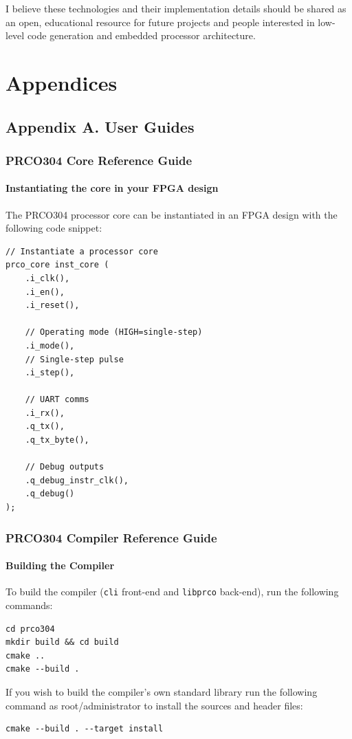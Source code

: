\documentclass[11pt,a4paper]{report}
\newcommand{\scname}{PRCO304}
\begin{document}
I believe these technologies and their implementation details should be shared as an open, educational resource for future projects and people interested in low-level code generation and embedded processor architecture.






\newpage



\newpage
\chapter{Appendices}
\linespread{1.0}
{\hypersetup{linkcolor=black}
\startcontents[chapters]
}

\section{Appendix A. User Guides}
\subsection{\scname{} Core Reference Guide}
\subsubsection*{Instantiating the core in your FPGA design}
The \scname{} processor core can be instantiated in an FPGA design with the following code snippet:
\begin{verbatim}
// Instantiate a processor core
prco_core inst_core (
    .i_clk(), 
    .i_en(), 
    .i_reset(),
    
    // Operating mode (HIGH=single-step)
    .i_mode(),
    // Single-step pulse
    .i_step(),
    
    // UART comms
    .i_rx(),
    .q_tx(),
    .q_tx_byte(),
    
    // Debug outputs
    .q_debug_instr_clk(),
    .q_debug()
);
\end{verbatim}


\subsection{\scname{} Compiler Reference Guide}
\subsubsection*{Building the Compiler}
To build the compiler (\verb|cli| front-end and \verb|libprco| back-end), run the following commands:
\begin{verbatim}
cd prco304
mkdir build && cd build
cmake ..
cmake --build .
\end{verbatim}
If you wish to build the compiler's own standard library run the following command as root/administrator to install the sources and header files:
\begin{verbatim}
cmake --build . --target install
\end{verbatim}
\end{document}

